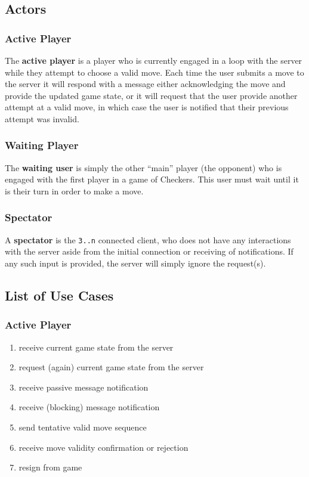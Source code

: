 \documentclass[letterpaper]{article}
\begin{document}
\subsection{Actors}
\label{sec:cases_actors}

\subsubsection{Active Player}
\label{sec:cases_actors_active}

The \textbf{active player} is a player who is currently engaged
in a loop with the server while they attempt to choose a valid
move. Each time the user submits a move to the server it will
respond with a message either acknowledging the move and provide
the updated game state, or it will request that the user provide
another attempt at a valid move, in which case the user is
notified that their previous attempt was invalid.

\subsubsection{Waiting Player}
\label{sec:cases_actors_waiting}

The \textbf{waiting user} is simply the other ``main'' player
(the opponent) who is engaged with the first player in a game of
Checkers. This user must wait until it is their turn in order to
make a move.

\subsubsection{Spectator}
\label{sec:cases_actors_spectator}

A \textbf{spectator} is the \texttt{3..n} connected client, who
does not have any interactions with the server aside from the
initial connection or receiving of notifications. If any such
input is provided, the server will simply ignore the request(s).

\subsection{List of Use Cases}
\label{sec:cases_list}

\subsubsection{Active Player}
\label{sec:cases_list_active}

\begin{enumerate}
    \item receive current game state from the server %
    \item request (again) current game state from the server %
    \item receive passive message notification %
    \item receive (blocking) message notification %
    \item send tentative valid move sequence %
    \item receive move validity confirmation or rejection %
    \item resign from game %
\end{enumerate}
\end{document}
